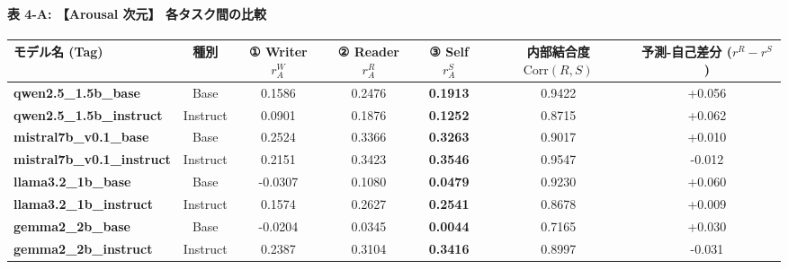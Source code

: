 \paragraph{表 4-A: 【Arousal 次元】 各タスク間の比較}
\begin{center}
\small
\begin{tabular}{lcccccc}
\toprule
\textbf{モデル名 (Tag)} & \textbf{種別} & \textbf{① Writer $r_A^W$} & \textbf{② Reader $r_A^R$} & \textbf{③ Self $r_A^S$} & \textbf{内部結合度 $\text{Corr}(R, S)$} & \textbf{予測-自己差分 ($r^R - r^S$)} \\
\midrule
\textbf{qwen2.5\_1.5b\_base} & Base & 0.1586 & 0.2476 & \textbf{0.1913} & 0.9422 & +0.056 \\
\textbf{qwen2.5\_1.5b\_instruct} & Instruct & 0.0901 & 0.1876 & \textbf{0.1252} & 0.8715 & +0.062 \\
\textbf{mistral7b\_v0.1\_base} & Base & 0.2524 & 0.3366 & \textbf{0.3263} & 0.9017 & +0.010 \\
\textbf{mistral7b\_v0.1\_instruct} & Instruct & 0.2151 & 0.3423 & \textbf{0.3546} & 0.9547 & -0.012 \\
\textbf{llama3.2\_1b\_base} & Base & -0.0307 & 0.1080 & \textbf{0.0479} & 0.9230 & +0.060 \\
\textbf{llama3.2\_1b\_instruct} & Instruct & 0.1574 & 0.2627 & \textbf{0.2541} & 0.8678 & +0.009 \\
\textbf{gemma2\_2b\_base} & Base & -0.0204 & 0.0345 & \textbf{0.0044} & 0.7165 & +0.030 \\
\textbf{gemma2\_2b\_instruct} & Instruct & 0.2387 & 0.3104 & \textbf{0.3416} & 0.8997 & -0.031 \\
\bottomrule
\end{tabular}
\end{center}


